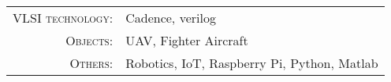 \begin{tabular}{rl}
    \textsc{VLSI technology:} & Cadence, verilog \\
   \textsc{Objects:} & UAV, Fighter Aircraft \\
   \textsc{Others:} & Robotics, IoT, Raspberry Pi, Python, Matlab \\
\end{tabular}